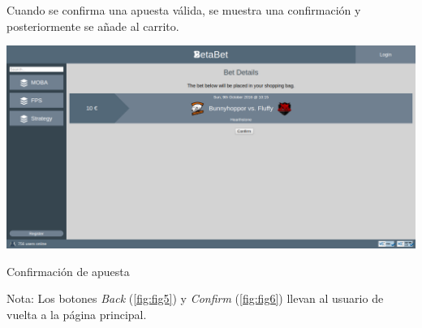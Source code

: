 \documentclass{article}
\begin{document}
Cuando se confirma una apuesta válida, se muestra una confirmación y posteriormente se añade al carrito.
\smallbreak
\begin{minipage}{\linewidth}
    \centering
    \captionsetup{type=figure}
    \includegraphics[width=\linewidth]{fig6}
    \caption{Confirmación de apuesta}
    \label{fig:fig6}
\end{minipage}
\smallbreak
Nota: Los botones \textit{Back} (\autoref{fig:fig5}) y \textit{Confirm} (\autoref{fig:fig6}) llevan al usuario de vuelta a la página principal.
\newpage
\end{document}
